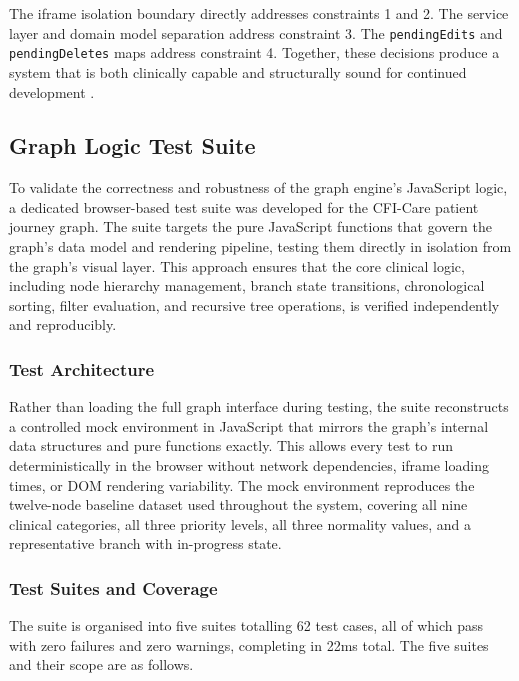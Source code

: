 The iframe isolation boundary directly addresses constraints 1 and 2. The
service layer and domain model separation address constraint 3. The
\texttt{pendingEdits} and \texttt{pendingDeletes} maps address constraint 4.
Together, these decisions produce a system that is both clinically capable
and structurally sound for continued development \cite{componentFrontEnd2021}.

\subsection{Graph Logic Test Suite}
\label{subsec:test-suite}

To validate the correctness and robustness of the graph engine's JavaScript
logic, a dedicated browser-based test suite was developed for the CFI-Care
patient journey graph. The suite targets the pure JavaScript functions that
govern the graph's data model and rendering pipeline, testing them directly
in isolation from the graph's visual layer. This approach ensures that the
core clinical logic, including node hierarchy management, branch state
transitions, chronological sorting, filter evaluation, and recursive tree
operations, is verified independently and reproducibly.

\subsubsection{Test Architecture}

Rather than loading the full graph interface during testing, the suite
reconstructs a controlled mock environment in JavaScript that mirrors the
graph's internal data structures and pure functions exactly. This allows every
test to run deterministically in the browser without network dependencies,
iframe loading times, or DOM rendering variability. The mock environment
reproduces the twelve-node baseline dataset used throughout the system,
covering all nine clinical categories, all three priority levels, all three
normality values, and a representative branch with in-progress state.

\subsubsection{Test Suites and Coverage}

The suite is organised into five suites totalling 62 test cases, all of which
pass with zero failures and zero warnings, completing in 22ms total. The five
suites and their scope are as follows.

